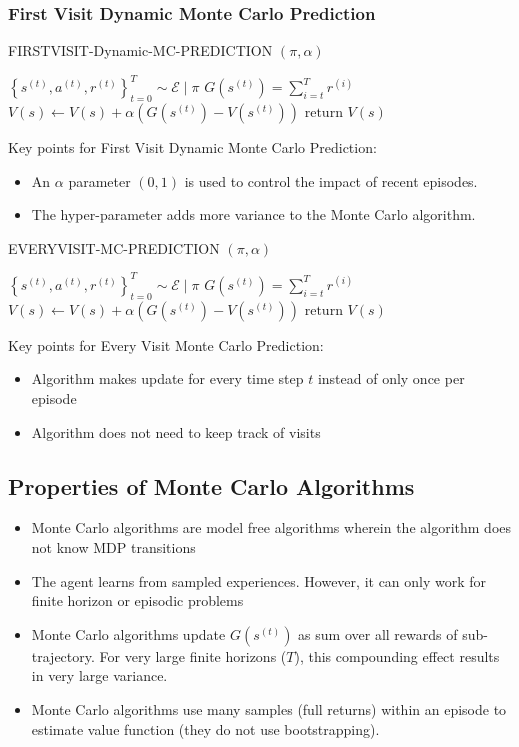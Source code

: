 \documentclass[11pt]{article}
\begin{document}
\subsubsection* {First Visit Dynamic Monte Carlo Prediction}
\begin{algorithm}[H]
\caption{FIRSTVISIT-Dynamic-MC-PREDICTION $(\pi, \alpha)$}
\label{algo:fvdmcp}
\begin{algorithmic}[1]
\STATE $\left\{s^{(t)}, a^{(t)}, r^{(t)}\right\}_{t=0}^{T} \sim \mathcal{E} \mid \pi$
\STATE $G\left(s^{(t)}\right) = \sum_{i=t}^{T} r^{(i)}$
\STATE $V(s) \leftarrow V(s) + \alpha (G(s^{(t)}) - V(s^{(t)}))$
\ENDIF
\ENDFOR
\ENDFOR
\STATE $\text{return } V(s) $
\end{algorithmic}
\end{algorithm}
Key points for First Visit Dynamic Monte Carlo Prediction:
\begin{itemize}
    \item An $\alpha$ parameter $(0,1)$ is used to control the impact of recent episodes.
    \item The hyper-parameter adds more variance to the Monte Carlo algorithm.
\end{itemize}
\begin{algorithm}[H]
\caption{EVERYVISIT-MC-PREDICTION $(\pi,\alpha)$}
\label{algo:evmcp}
\begin{algorithmic}[1]
\STATE $\left\{s^{(t)}, a^{(t)}, r^{(t)}\right\}_{t=0}^{T} \sim \mathcal{E} \mid \pi$
\STATE $G\left(s^{(t)}\right) = \sum_{i=t}^{T} r^{(i)}$
\STATE $V(s) \leftarrow V(s) + \alpha (G(s^{(t)}) - V(s^{(t)}))$
\ENDFOR
\ENDFOR
\STATE $\text{return } V(s) $
\end{algorithmic}
\end{algorithm}
Key points for Every Visit Monte Carlo Prediction:
\begin{itemize}
    \item Algorithm makes update for every time step $t$ instead of only once per episode
    \item Algorithm does not need to keep track of visits 
\end{itemize}
\subsection* {Properties of Monte Carlo Algorithms}
\begin{itemize}
    \item Monte Carlo algorithms are model free algorithms wherein the algorithm does not know MDP transitions
    \item The agent learns from sampled experiences. However, it can only work for finite horizon or episodic problems
    \item Monte Carlo algorithms update $G(s^{(t)})$ as sum over all rewards of sub-trajectory. For very large finite horizons ($T$), this compounding effect results in very large variance.
    \item Monte Carlo algorithms use many samples (full returns) within an episode to estimate value function (they do not use bootstrapping).
\end{itemize}
\end{document}
